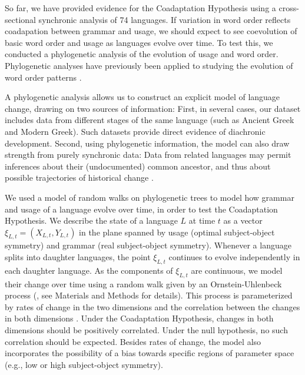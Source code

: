 \documentclass[11pt,a4paper]{article}
\begin{document}


So far, we have provided evidence for the Coadaptation Hypothesis using a cross-sectional synchronic analysis of 74 languages.
If variation in word order reflects coadapation between grammar and usage, we should expect to see coevolution of basic word order and usage as languages evolve over time.
To test this, we conducted a phylogenetic analysis of the evolution of usage and word order.
Phylogenetic analyses have previously been applied to studying the evolution of word order patterns \citep{dunn-evolved-2011, maurits2014tracing}.

A phylogenetic analysis allows us to construct an explicit model of language change, drawing on two sources of information:
First, in several cases, our dataset includes data from different stages of the same language (such as Ancient Greek and Modern Greek).
Such datasets provide direct evidence of diachronic development.
Second, using phylogenetic information, the model can also draw strength from purely synchronic data:
Data from related languages may permit inferences about their (undocumented) common ancestor, and thus about possible trajectories of historical change \citep{pagel2004bayesian, dunn-evolved-2011, maurits2014tracing}.


We used a model of random walks on phylogenetic trees \citep{felsenstein1973maximum,pagel1997inferring, pagel2004bayesian} to model how grammar and usage of a language evolve over time, in order to test the Coadaptation Hypothesis.
We describe the state of a language $L$ at time $t$ as a vector $\xi_{L,t} = (X_{L,t}, Y_{L,t})$ in the plane spanned by usage (optimal subject-object symmetry) and grammar (real subject-object symmetry).
Whenever a language splits into daughter languages, the point $\xi_{L,t}$ continues to evolve independently in each daughter language.
As the components of $\xi_{L,t}$ are continuous, we model their change over time using a random walk given by an Ornstein-Uhlenbeck process (\citep{blackwell2003bayesian}, see Materials and Methods for details).
This process is parameterized by rates of change in the two dimensions and the correlation between the changes in both dimensions \citep{felsenstein1973maximum,freckleton2012fast}.
Under the Coadaptation Hypothesis, changes in both dimensions should be positively correlated.
Under the null hypothesis, no such correlation should be expected.
Besides rates of change, the model also incorporates the possibility of a bias towards specific regions of parameter space (e.g., low or high subject-object symmetry).
\end{document}
